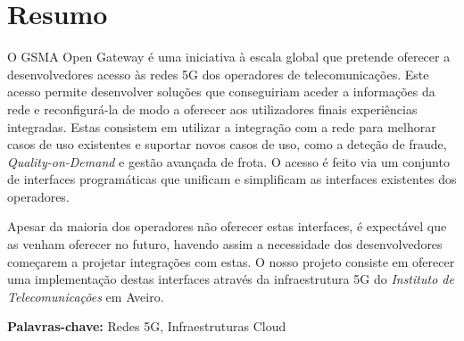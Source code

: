 \chapter*{\Large\centering Resumo}
\thispagestyle{empty}

O GSMA Open Gateway é uma iniciativa à escala global que pretende oferecer a
desenvolvedores acesso às redes 5G dos operadores de telecomunicações. Este
acesso permite desenvolver soluções que conseguiriam aceder a informações da
rede e reconfigurá-la de modo a oferecer aos utilizadores finais experiências
integradas. Estas consistem em utilizar a integração com a rede para melhorar
casos de uso existentes e suportar novos casos de uso, como a deteção de
fraude, \emph{Quality-on-Demand} e gestão avançada de frota. O acesso é feito
via um conjunto de interfaces programáticas que unificam e simplificam as
interfaces existentes dos operadores.

Apesar da maioria dos operadores não oferecer estas interfaces, é expectável
que as venham oferecer no futuro, havendo assim a necessidade dos
desenvolvedores começarem a projetar integrações com estas. O nosso projeto
consiste em oferecer uma implementação destas interfaces através da
infraestrutura 5G do \emph{Instituto de Telecomunicações} em Aveiro.

\vspace{1cm}

\noindent\textbf{Palavras-chave:} Redes 5G, Infraestruturas Cloud
